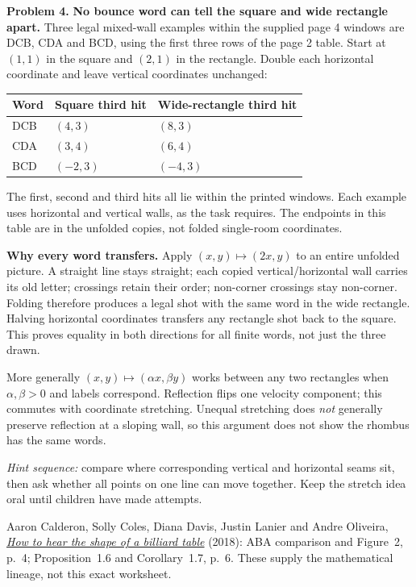\documentclass[11pt,letterpaper]{article}
\newcommand{\sectiontitle}[1]{\par\vspace{4pt}{\large\bfseries #1}\par}
\newcommand{\answer}[1]{\par\vspace{3pt}\textbf{Problem #1.} }
\begin{document}
\answer{4} \textbf{No bounce word can tell the square and wide rectangle apart.} Three legal mixed-wall examples within the supplied page 4 windows are DCB, CDA and BCD, using the first three rows of the page 2 table. Start at $(1,1)$ in the square and $(2,1)$ in the rectangle. Double each horizontal coordinate and leave vertical coordinates unchanged:
\begin{center}\renewcommand{\arraystretch}{1.25}
\begin{tabular}{@{}lll@{}}
Word & Square third hit & Wide-rectangle third hit\\\hline
DCB & $(4,3)$ & $(8,3)$\\
CDA & $(3,4)$ & $(6,4)$\\
BCD & $(-2,3)$ & $(-4,3)$
\end{tabular}\end{center}
The first, second and third hits all lie within the printed windows. Each example uses horizontal and vertical walls, as the task requires. The endpoints in this table are in the unfolded copies, not folded single-room coordinates.

\textbf{Why every word transfers.} Apply $(x,y)\mapsto(2x,y)$ to an entire unfolded picture. A straight line stays straight; each copied vertical/horizontal wall carries its old letter; crossings retain their order; non-corner crossings stay non-corner. Folding therefore produces a legal shot with the same word in the wide rectangle. Halving horizontal coordinates transfers any rectangle shot back to the square. This proves equality in both directions for all finite words, not just the three drawn.

More generally $(x,y)\mapsto(\alpha x,\beta y)$ works between any two rectangles when $\alpha,\beta>0$ and labels correspond. Reflection flips one velocity component; this commutes with coordinate stretching. Unequal stretching does \emph{not} generally preserve reflection at a sloping wall, so this argument does not show the rhombus has the same words.

\textit{Hint sequence:} compare where corresponding vertical and horizontal seams sit, then ask whether all points on one line can move together. Keep the stretch idea oral until children have made attempts.

\newpage
\sectiontitle{Sources, checks, and limits}
Aaron Calderon, Solly Coles, Diana Davis, Justin Lanier and Andre Oliveira, \href{https://justinlanier.org/wp-content/uploads/2020/10/bounce.pdf}{\emph{How to hear the shape of a billiard table}} (2018): ABA comparison and Figure~2, p.~4; Proposition~1.6 and Corollary~1.7, p.~6. These supply the mathematical lineage, not this exact worksheet.
\end{document}
